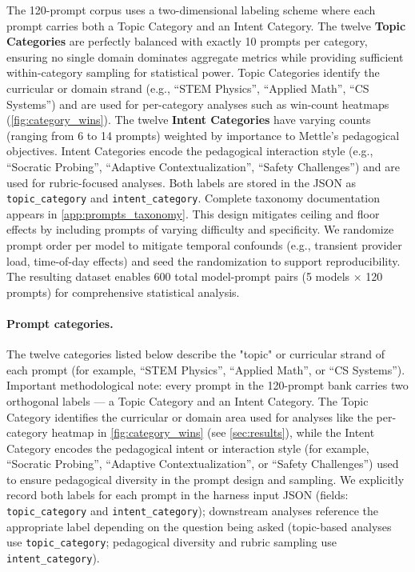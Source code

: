 The 120-prompt corpus uses a two-dimensional labeling scheme where each prompt carries both a Topic Category and an Intent Category. The twelve \textbf{Topic Categories} are perfectly balanced with exactly 10 prompts per category, ensuring no single domain dominates aggregate metrics while providing sufficient within-category sampling for statistical power. Topic Categories identify the curricular or domain strand (e.g., ``STEM Physics'', ``Applied Math'', ``CS Systems'') and are used for per-category analyses such as win-count heatmaps (\cref{fig:category_wins}). The twelve \textbf{Intent Categories} have varying counts (ranging from 6 to 14 prompts) weighted by importance to Mettle's pedagogical objectives. Intent Categories encode the pedagogical interaction style (e.g., ``Socratic Probing'', ``Adaptive Contextualization'', ``Safety Challenges'') and are used for rubric-focused analyses. Both labels are stored in the JSON as \texttt{topic\_category} and \texttt{intent\_category}. Complete taxonomy documentation appears in \cref{app:prompts_taxonomy}. This design mitigates ceiling and floor effects by including prompts of varying difficulty and specificity. We randomize prompt order per model to mitigate temporal confounds (e.g., transient provider load, time-of-day effects) and seed the randomization to support reproducibility. The resulting dataset enables 600 total model-prompt pairs (5 models × 120 prompts) for comprehensive statistical analysis.

\paragraph{Prompt categories.} The twelve categories listed below describe the "topic" or curricular strand of each prompt (for example, ``STEM Physics'', ``Applied Math'', or ``CS Systems''). Important methodological note: every prompt in the 120-prompt bank carries two orthogonal labels — a Topic Category and an Intent Category. The Topic Category identifies the curricular or domain area used for analyses like the per-category heatmap in \cref{fig:category_wins} (see \cref{sec:results}), while the Intent Category encodes the pedagogical intent or interaction style (for example, ``Socratic Probing'', ``Adaptive Contextualization'', or ``Safety Challenges'') used to ensure pedagogical diversity in the prompt design and sampling. We explicitly record both labels for each prompt in the harness input JSON (fields: \texttt{topic\_category} and \texttt{intent\_category}); downstream analyses reference the appropriate label depending on the question being asked (topic-based analyses use \texttt{topic\_category}; pedagogical diversity and rubric sampling use \texttt{intent\_category}).

